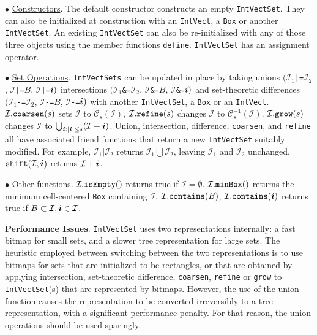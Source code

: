 \begin{trivlist}
\item $\bullet$ \underline{Constructors}.  The default constructor constructs an empty
{\tt{IntVectSet}}.  They can also be initialized at construction with
an {\tt{IntVect}}, a {\tt{Box}} or another {\tt{IntVectSet}}.  An
existing {\tt{IntVectSet}} can also be re-initialized with any of
those three objects using the member functions {\tt define}.
{\tt{IntVectSet}} has an assignment operator.

\item $\bullet$ \underline{Set Operations}.  {\tt{IntVectSets}} can be updated in place by
taking unions $({\mathcal{I}}_1 ${\tt{|=}}$ {\mathcal{I}}_2$, ${\mathcal{I}} ${\tt{|=}}$ B$, ${\mathcal{I}} ${\tt{|=}}$ {\boldsymbol{i}})$ intersections $({\mathcal{I}}_1
${\tt{\&=}}$ {\mathcal{I}}_2$, ${\mathcal{I}} ${\tt{\&=}}$ B$, ${\mathcal{I}} ${\tt{\&=}}$ {\boldsymbol{i}})$ and set-theoretic differences $({\mathcal{I}}_1 ${\tt{-=}}$
{\mathcal{I}}_2$, ${\mathcal{I}} ${\tt{-=}}$ B$, ${\mathcal{I}} ${\tt{-=}}$ {\boldsymbol{i}})$ with another {\tt{IntVectSet}}, a
{\tt{Box}} or an {\tt{IntVect}}.  ${\mathcal{I}}.{\tt{coarsen}}(s)$ sets
${\mathcal{I}}$ to
${\mathcal{C}}_s({\mathcal{I}})$, ${\mathcal{I}}.{\tt{refine}}(s)$ changes ${\mathcal{I}}$ to
${\mathcal{C}}^{-1}_s({\mathcal{I}})$.  ${\mathcal{I}}.{\tt{grow}}(s)$ changes ${\mathcal{I}}$ to
$\bigcup_{{\boldsymbol{i}}:|{\boldsymbol{i}}| \leq s} ({\mathcal{I}} + {\boldsymbol{i}})$.
Union, intersection, difference, {\tt coarsen}, and {\tt refine} all
have associated friend functions that return a new {\tt{IntVectSet}}
suitably modified.  For example, ${\mathcal{I}}_1|{\mathcal{I}}_2$
returns ${\mathcal{I}}_1 \bigcup {\mathcal{I}}_2$,
leaving ${\mathcal{I}}_1$ and ${\mathcal{I}}_2$ unchanged.  ${\tt{shift}}({\mathcal{I}},{\boldsymbol{i}})$ returns
${\mathcal{I}} + {\boldsymbol{i}}$.

\item $\bullet$ \underline{Other functions}.  
${\mathcal{I}}.{\tt{isEmpty}}()$ returns true if ${\mathcal{I}} = \emptyset$.
${\mathcal{I}}.{\tt{minBox}}()$ returns the minimum cell-centered
{\tt{Box}} containing ${\mathcal{I}}$.  ${\mathcal{I}}.{\tt{contains}}(B)$,
${\mathcal{I}}.{\tt{contains}}({\boldsymbol{i}})$ returns true if 
$B \subset {\mathcal{I}}, {\boldsymbol{i}} \in {\mathcal{I}}$.

\end{trivlist}

\noindent
{\bf Performance Issues}. {\tt IntVectSet} uses two representations
internally: a fast bitmap for small sets, and a slower tree representation for
large sets. The heuristic employed between switching between the two
representations is to use bitmaps for sets that are initialized to be
rectangles, or that are obtained by applying 
intersection, set-theoretic difference, {\tt coarsen}, {\tt refine}
or {\tt grow} to {\tt IntVectSet}(s) that are represented by bitmaps.
However, the use of the union function causes the representation to be
converted irreversibly to a tree representation, with a significant
performance penalty. For that reason, the union operations should be
used sparingly.


